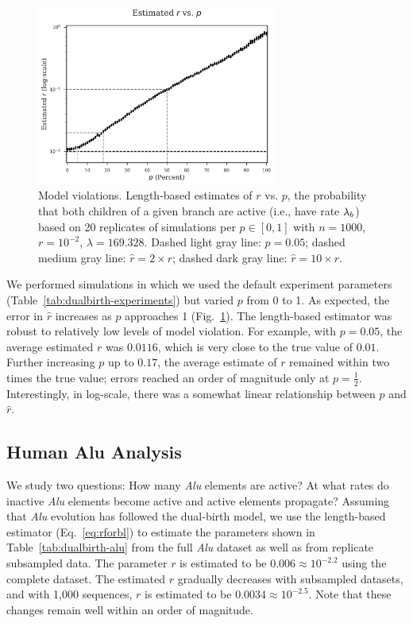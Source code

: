 \begin{figure} %
\centering
\includegraphics[width=0.7\textwidth]{figs/dualbirth-model-violations}
\caption[Model Violations]
{Model violations. Length-based estimates of $r$ vs. $p$, the probability that both children of a given branch are active (i.e., have rate $\lambda_b$) based on 20 replicates of simulations per $p\in[0,1]$ with $n=1000$, $r=10^{-2}$, $\lambda=169.328$. Dashed light gray line: $p=0.05$; dashed medium gray line: $\hat{r}=2\times r$; dashed dark gray line: $\hat{r}=10\times r$.}
\label{fig:dualbirth-model-violations}
\end{figure}

We performed simulations in which we used the default experiment parameters (Table~\ref{tab:dualbirth-experiments}) but varied $p$ from 0 to 1. As expected, the error in $\hat{r}$ increases as $p$ approaches 1 (Fig.~\ref{fig:dualbirth-model-violations}). The length-based estimator was  robust to relatively low levels of model violation. For example, with $p=0.05$, the average estimated $r$ was $0.0116$, which is very close to the true value of $0.01$. Further increasing $p$ up to $0.17$, the average estimate of $r$ remained within two times the true value; errors reached an order of magnitude only at $p=\frac{1}{2}$. Interestingly, in log-scale, there was a somewhat linear relationship between $p$ and $\hat{r}$.

\subsection{Human Alu Analysis}\label{sec:dualbirth-human-alu-analyses}
We study two questions: How many \textit{Alu} elements are active? At what rates do inactive \textit{Alu} elements become active and active elements propagate? Assuming that \textit{Alu} evolution has followed the dual-birth model, we use the length-based estimator (Eq.~\ref{eq:rforbl}) to estimate the parameters shown in Table~\ref{tab:dualbirth-alu} from the full \textit{Alu} dataset as well as from replicate subsampled data. The parameter $r$ is estimated to be $0.006\approx10^{-2.2}$ using the complete dataset. The estimated $r$ gradually decreases with subsampled datasets, and with 1,000 sequences, $r$ is estimated to be $0.0034\approx10^{-2.5}$. Note that these changes remain well within an order of magnitude.

